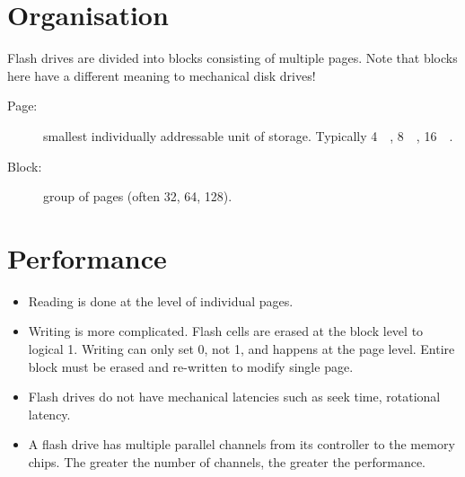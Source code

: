 \documentclass[slides]{pgnotes}
\begin{document}

\section{Organisation}

Flash drives are divided into blocks consisting of multiple pages.
Note that blocks here have a different meaning to mechanical disk drives!


\begin{description}
\item[Page:] smallest individually addressable unit of storage. Typically \SI{4}{\kilo\byte}, \SI{8}{\kilo\byte}, \SI{16}{\kilo\byte}.
\item[Block:] group of pages (often 32, 64, 128).
\end{description}

\section{Performance}

\begin{itemize}
\item Reading is done at the level of individual pages.
\item Writing is more complicated.  Flash cells are erased at the block level to logical 1.  Writing can only set 0, not 1, and happens at the page level. Entire block must be erased and re-written to modify single page.
\item Flash drives do not have mechanical latencies such as seek time, rotational latency.
\item A flash drive has multiple parallel channels from its controller to the memory chips.  The greater the number of channels, the greater the performance.
\end{itemize}
\end{document}
